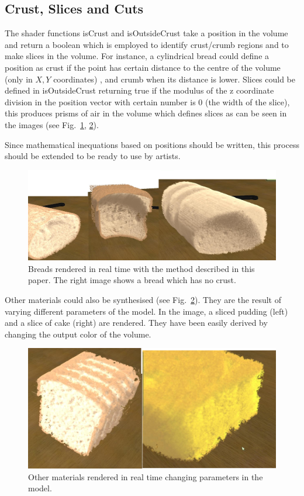 \documentclass[oneside,a4paper,english,links]{amca}
\begin{document}
\subsection{Crust, Slices and Cuts}
The shader functions isCrust and isOutsideCrust take a position in the volume and return a boolean which is employed to identify crust/crumb regions and to make slices in the volume. For instance, a cylindrical bread could define a position as crust if the point has certain distance to the centre of the volume (only in $X,Y$ coordinates) , and crumb when its distance is lower. Slices could be defined in isOutsideCrust returning true if the modulus of the z coordinate division in the position vector with certain number is $0$ (the width of the slice), this produces prisms of air in the volume which defines slices as can be seen in the images (see Fig.~\ref{fg:fig5}, \ref{fg:fig6}).

Since mathematical inequations based on positions should be written, this process should be extended to be ready to use by artists.

\begin{figure}[htb!]
  \centerline{\includegraphics[scale=0.25]{fig5}}
  \caption{Breads rendered in real time with the method described in this paper. The right image shows a bread which has no crust. }
  \label{fg:fig5}
\end{figure}

Other materials could also be synthesised (see Fig.~\ref{fg:fig6}). They are the result of varying different parameters of the model. In the image, a sliced pudding (left) and a slice of cake (right) are rendered. They have been easily derived by changing the output color of the volume.

\begin{figure}[htb!]
  \centerline{\includegraphics[scale=0.25]{fig6}}
  \caption{Other materials rendered in real time changing parameters in the model. }
  \label{fg:fig6}
\end{figure}
\end{document}

